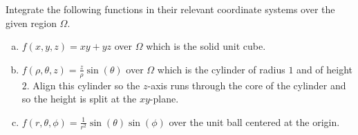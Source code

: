 \documentclass[12pt]{article} %
\begin{document}
\vspace*{1cm}
\begin{problem}
Integrate the following functions in their relevant coordinate systems over the given region $\Omega$.
\begin{enumerate}[(a)]
    \item $f(x,y,z) = xy+yz$ over $\Omega$ which is the solid unit cube.
    \item $f(\rho,\theta,z) = \frac{z}{\rho}\sin(\theta)$ over $\Omega$ which is the cylinder of radius $1$ and of height $2$. Align this cylinder so the $z$-axis runs through the core of the cylinder and so the height is split at the $xy$-plane.
    \item $f(r,\theta,\phi) = \frac{1}{r^2}\sin(\theta)\sin(\phi)$ over the unit ball centered at the origin.
\end{enumerate}
\end{problem}
\end{document}
